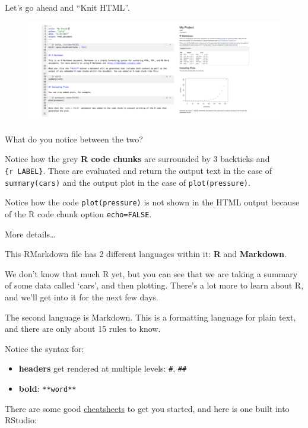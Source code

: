 \documentclass[]{book}
\providecommand{\tightlist}{%
  \setlength{\itemsep}{0pt}\setlength{\parskip}{0pt}}
\theoremstyle{definition}
\theoremstyle{definition}
\theoremstyle{definition}
\theoremstyle{remark}
\begin{document}
Let's go ahead and ``Knit HTML''.

\begin{figure}
\centering
\includegraphics{img/rmarkdown_side_by_side.png}
\caption{}
\end{figure}

What do you notice between the two?

Notice how the grey \textbf{R code chunks} are surrounded by 3 backticks
and \texttt{\{r\ LABEL\}}. These are evaluated and return the output
text in the case of \texttt{summary(cars)} and the output plot in the
case of \texttt{plot(pressure)}.

Notice how the code \texttt{plot(pressure)} is not shown in the HTML
output because of the R code chunk option \texttt{echo=FALSE}.

More details\ldots{}

This RMarkdown file has 2 different languages within it: \textbf{R} and
\textbf{Markdown}.

We don't know that much R yet, but you can see that we are taking a
summary of some data called `cars', and then plotting. There's a lot
more to learn about R, and we'll get into it for the next few days.

The second language is Markdown. This is a formatting language for plain
text, and there are only about 15 rules to know.

Notice the syntax for:

\begin{itemize}
\tightlist
\item
  \textbf{headers} get rendered at multiple levels: \texttt{\#},
  \texttt{\#\#}
\item
  \textbf{bold}: \texttt{**word**}
\end{itemize}

There are some good
\href{https://github.com/adam-p/markdown-here/wiki/Markdown-Here-Cheatsheet}{cheatsheets}
to get you started, and here is one built into RStudio:
\end{document}
